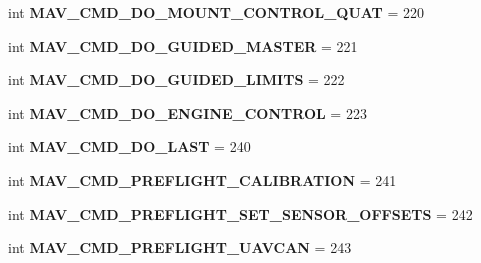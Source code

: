 \begin{DoxyCompactItemize}
\mbox{\label{namespacepymavlink_1_1dialects_1_1v10_a02e5c8e58688778eb9ae3120bc16b3f2}} 
int {\bfseries M\+A\+V\+\_\+\+C\+M\+D\+\_\+\+D\+O\+\_\+\+M\+O\+U\+N\+T\+\_\+\+C\+O\+N\+T\+R\+O\+L\+\_\+\+Q\+U\+AT} = 220
\item 
\mbox{\label{namespacepymavlink_1_1dialects_1_1v10_aa1fae1b741b6ecd2ef196bc8c51c5af1}} 
int {\bfseries M\+A\+V\+\_\+\+C\+M\+D\+\_\+\+D\+O\+\_\+\+G\+U\+I\+D\+E\+D\+\_\+\+M\+A\+S\+T\+ER} = 221
\item 
\mbox{\label{namespacepymavlink_1_1dialects_1_1v10_ae8cc5a413d0454818d666133b18e443e}} 
int {\bfseries M\+A\+V\+\_\+\+C\+M\+D\+\_\+\+D\+O\+\_\+\+G\+U\+I\+D\+E\+D\+\_\+\+L\+I\+M\+I\+TS} = 222
\item 
\mbox{\label{namespacepymavlink_1_1dialects_1_1v10_ace749326afbd9a9d39db45fadec4e93f}} 
int {\bfseries M\+A\+V\+\_\+\+C\+M\+D\+\_\+\+D\+O\+\_\+\+E\+N\+G\+I\+N\+E\+\_\+\+C\+O\+N\+T\+R\+OL} = 223
\item 
\mbox{\label{namespacepymavlink_1_1dialects_1_1v10_aa84b041702d1606e12f223ef90988d90}} 
int {\bfseries M\+A\+V\+\_\+\+C\+M\+D\+\_\+\+D\+O\+\_\+\+L\+A\+ST} = 240
\item 
\mbox{\label{namespacepymavlink_1_1dialects_1_1v10_a756a9bb67cbd0ffd360d669a6c7021bf}} 
int {\bfseries M\+A\+V\+\_\+\+C\+M\+D\+\_\+\+P\+R\+E\+F\+L\+I\+G\+H\+T\+\_\+\+C\+A\+L\+I\+B\+R\+A\+T\+I\+ON} = 241
\item 
\mbox{\label{namespacepymavlink_1_1dialects_1_1v10_a9ce37b6246b59b55401123d17cf215b1}} 
int {\bfseries M\+A\+V\+\_\+\+C\+M\+D\+\_\+\+P\+R\+E\+F\+L\+I\+G\+H\+T\+\_\+\+S\+E\+T\+\_\+\+S\+E\+N\+S\+O\+R\+\_\+\+O\+F\+F\+S\+E\+TS} = 242
\item 
\mbox{\label{namespacepymavlink_1_1dialects_1_1v10_aeada6a90f0575cda32edf2838d8da328}} 
int {\bfseries M\+A\+V\+\_\+\+C\+M\+D\+\_\+\+P\+R\+E\+F\+L\+I\+G\+H\+T\+\_\+\+U\+A\+V\+C\+AN} = 243
\item 

\end{DoxyCompactItemize}
